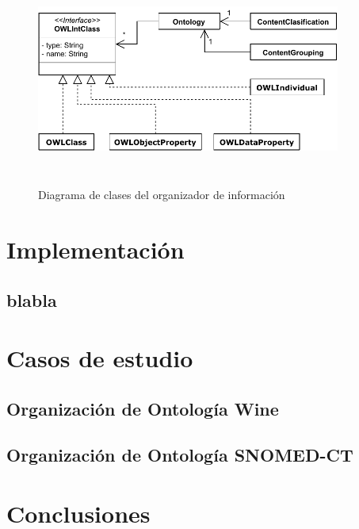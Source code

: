 \begin{figure}[H]
    \centering
    \includegraphics[width=10cm, height=7cm]{img/organizacion_informacion/clases_organizador_informacion.pdf}
    \caption{Diagrama de clases del organizador de información}
    \label{fig:diagrama_clases_organizador}
\end{figure}

\section{Implementación}
\subsection{blabla}

\section{Casos de estudio}
\subsection{Organización de Ontología Wine}
\subsection{Organización de Ontología SNOMED-CT}

\section{Conclusiones}